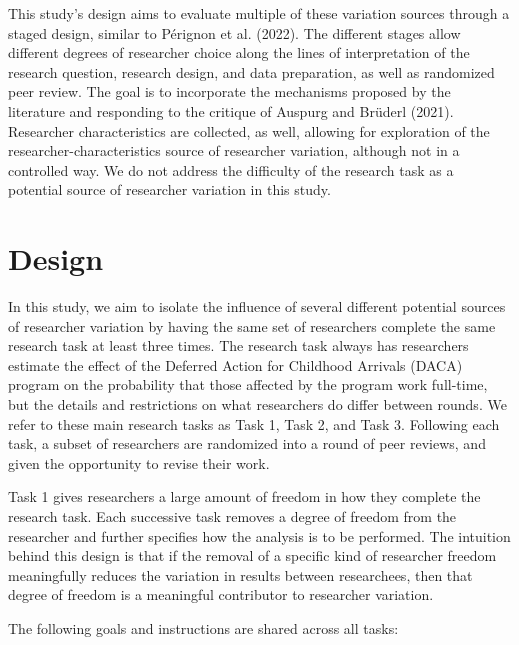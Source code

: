 \documentclass[
  letterpaper,
  DIV=11,
  numbers=noendperiod]{scrartcl}
\begin{document}
This study's design aims to evaluate multiple of these variation sources
through a staged design, similar to Pérignon et al. (2022). The
different stages allow different degrees of researcher choice along the
lines of interpretation of the research question, research design, and
data preparation, as well as randomized peer review. The goal is to
incorporate the mechanisms proposed by the literature and responding to
the critique of Auspurg and Brüderl (2021). Researcher characteristics
are collected, as well, allowing for exploration of the
researcher-characteristics source of researcher variation, although not
in a controlled way. We do not address the difficulty of the research
task as a potential source of researcher variation in this study.

\hypertarget{design}{%
\section{Design}\label{design}}

In this study, we aim to isolate the influence of several different
potential sources of researcher variation by having the same set of
researchers complete the same research task at least three times. The
research task always has researchers estimate the effect of the Deferred
Action for Childhood Arrivals (DACA) program on the probability that
those affected by the program work full-time, but the details and
restrictions on what researchers do differ between rounds. We refer to
these main research tasks as Task 1, Task 2, and Task 3. Following each
task, a subset of researchers are randomized into a round of peer
reviews, and given the opportunity to revise their work.

Task 1 gives researchers a large amount of freedom in how they complete
the research task. Each successive task removes a degree of freedom from
the researcher and further specifies how the analysis is to be
performed. The intuition behind this design is that if the removal of a
specific kind of researcher freedom meaningfully reduces the variation
in results between researchees, then that degree of freedom is a
meaningful contributor to researcher variation.

The following goals and instructions are shared across all tasks:
\end{document}
